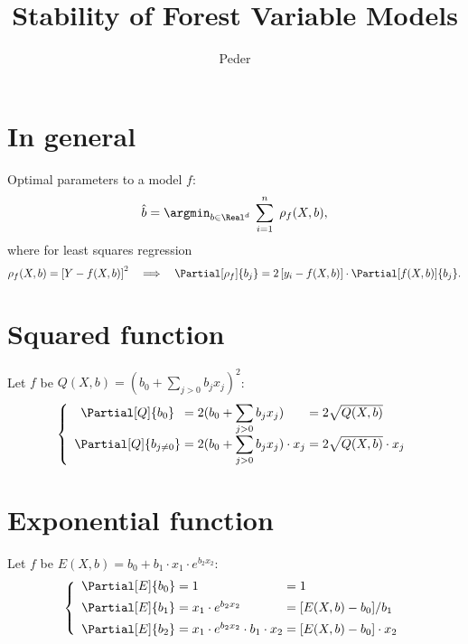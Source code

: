 \documentclass[10pt,english,a4paper]{article}
\title{Stability of Forest Variable Models}
\author{Peder}
\newcommand{\PP}{b}
\newcommand{\myF}[1]{#1(X, \PP)}
\newcommand{\mtrc}[1]{x_{#1}}
\begin{document}


\section{In general}

Optimal parameters to a model $f$: 
$$
	\hat{\PP}	= \argmin_{\PP\in\Real^d\;}\sum_{i=1}^n\; \myF{   \rho_f} 
	,
$$
where for least squares regression
$$
	\myF{\rho_f} = \left[ Y - \myF{f} \right]^2
	\quad\Longrightarrow\quad
	\Partial[\rho_f]{\PP_j} = 2\left[ y_i - \myF{f} \right]\cdot\Partial[\myF{f}]{\PP_j}
	.
$$



\section{Squared function}

\newcommand{\Lbase}{\PP_0 + \displaystyle\sum_{j>0}\PP_j\mtrc{j}}%

Let $f$ be $\myF{Q} = (\Lbase)^2$:
$$
	\left\{\begin{array}{c@{\;=\;}l@{\;=\;}l}
		\Partial[Q]{\PP_0}			& 2(\Lbase)					& 2\sqrt{\myF{Q}}					\\[0.5em]
		\Partial[Q]{\PP_{j\ne 0}}	& 2(\Lbase)\cdot\mtrc{j}	& 2\sqrt{\myF{Q}}\cdot\mtrc{j}
	\end{array}\right.
$$



\section{Exponential function}

\newcommand{\Ebase}{\mtrc{1}\cdot e^{\PP_2\mtrc{2}}}%

Let $f$ be $\myF{E} = \PP_0 + \PP_1\cdot\Ebase$:
$$
	\left\{\begin{array}{c@{\;=\;}l@{\;=\;}l}
		\Partial[E]{\PP_0}	& 1									& 1									\\[0.5em]
		\Partial[E]{\PP_1}	& \Ebase\							& [\myF{E} - \PP_0]/ \PP_1			\\[0.5em]
		\Partial[E]{\PP_2}	& \Ebase\cdot\PP_1\cdot\mtrc{2}		& [\myF{E} - \PP_0]\cdot\mtrc{2}
	\end{array}\right.
$$
\end{document}
